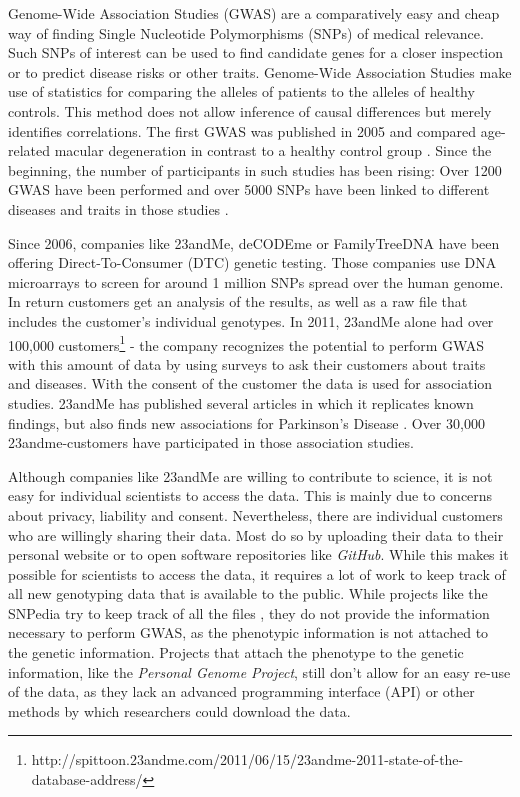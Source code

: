 \documentclass[10pt]{article}
\begin{document}
Genome-Wide Association Studies (GWAS) are a comparatively easy and cheap way of finding Single Nucleotide Polymorphisms (SNPs) of medical relevance. Such SNPs of interest can be used to find candidate genes for a closer inspection or to predict disease risks or other traits. Genome-Wide Association Studies make use of statistics for comparing the alleles of patients to the alleles of healthy controls. This method does not allow inference of causal differences but merely identifies correlations. The first GWAS was published in 2005 and compared age-related macular degeneration in contrast to a healthy control group \cite{Klein2005}. Since the beginning, the number of participants in such studies has been rising: Over 1200 GWAS have been performed \cite{Johnson2009} and over 5000 SNPs have been linked to different diseases and traits in those studies \cite{Hindorff2009}. %

Since 2006, companies like 23andMe, deCODEme or FamilyTreeDNA have been offering Direct-To-Consumer (DTC) genetic testing. Those companies use DNA microarrays to screen for around 1 million SNPs spread over the human genome. In return customers get an analysis of the results, as well as a raw file that includes the customer's individual genotypes. In 2011, 23andMe alone had over 100,000 customers\footnote{http://spittoon.23andme.com/2011/06/15/23andme-2011-state-of-the-database-address/} - the company recognizes the potential to perform GWAS with this amount of data by using surveys to ask their customers about traits and diseases. With the consent of the customer the data is used for association studies. 23andMe has published several articles in which it replicates known findings, but also finds new associations for Parkinson's Disease \cite{Eriksson2010, Do2011}. Over 30,000 23andme-customers have participated in those association studies.  

Although companies like 23andMe are willing to contribute to science, it is not easy for individual scientists to access the data. This is mainly due to concerns about privacy, liability and consent. Nevertheless, there are individual customers who are willingly sharing their data. Most do so by uploading their data to their personal website or to open software repositories like \textit{GitHub}. While this makes it possible for scientists to access the data, it requires a lot of work to keep track of all new genotyping data that is available to the public. While projects like the SNPedia try to keep track of all the files \cite{Cariaso2011}, they do not provide the information necessary to perform GWAS, as the phenotypic information is not attached to the genetic information. Projects that attach the phenotype to the genetic information, like the \textit{Personal Genome Project}, still don't allow for an easy re-use of the data, as they lack an advanced programming interface (API) or other methods by which researchers could download the data.  
\end{document}
